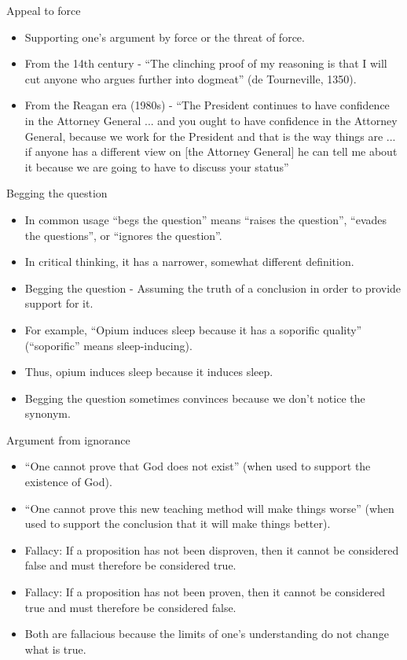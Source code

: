 \documentclass{beamer}
\begin{document}
\begin{frame}{Appeal to force}
\begin{itemize}
\item Supporting one's argument by force or the threat of force.
\item From the 14th century - ``The clinching proof of my reasoning is that I will cut anyone who argues further into dogmeat'' (de Tourneville, 1350).
\item  From the Reagan era (1980s) - ``The President continues to have confidence in the Attorney General ... and you ought to have confidence in the Attorney General, because we work for the President and that is the way things are ... if anyone has a different view on [the Attorney General] he can tell me about it because we are going to have to discuss your status''
\end{itemize}
\end{frame}

\begin{frame}{Begging the question}
\begin{itemize}
\item In common usage ``begs the question'' means ``raises the question'', ``evades the questions'', or ``ignores the question''. 
\item In critical thinking, it has a narrower, somewhat different definition.
\item Begging the question - Assuming the truth of a conclusion in order to provide support for it.
\item For example, ``Opium induces sleep because it has a soporific quality'' (``soporific'' means sleep-inducing).
\item Thus, opium induces sleep because it induces sleep.
\item Begging the question sometimes convinces because we don't notice the synonym.
\end{itemize}
\end{frame}

\begin{frame}{Argument from ignorance}
\begin{itemize}
\item ``One cannot prove that God does not exist'' (when used to support the existence of God).
\item ``One cannot prove this new teaching method will make things worse'' (when used to support the conclusion that it will make things better). 
\item Fallacy: If a proposition has not been disproven, then it cannot be considered false and must therefore be considered true.
\item Fallacy: If a proposition has not been proven, then it cannot be considered true and must therefore be considered false.
\item Both are fallacious because the limits of one's understanding do not change what is true.
\end{itemize}
\end{frame}
\end{document}
